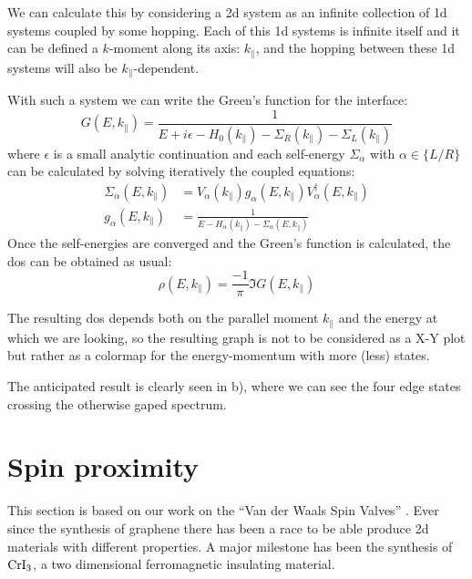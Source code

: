 We  can calculate this by considering a \ac{2d} system as an infinite collection of \ac{1d} systems coupled by some hopping. Each of this \ac{1d} systems is infinite itself and it can be defined a $k$-moment along its axis: $k_\parallel$, and the hopping between these \ac{1d} systems will also be $k_\parallel$-dependent.

With such a system we can write the Green's function for the interface:
\begin{equation}
  G(E,k_{\parallel}) = \frac{1}{E+i\epsilon-H_0(k_\parallel)-\Sigma_R(k_\parallel)-\Sigma_L(k_\parallel)}
\end{equation}
where $\epsilon$ is a small analytic continuation and each self-energy $\Sigma_\alpha$ with $\alpha\in\{L/R\}$ can be calculated by solving iteratively the coupled equations:
\begin{equation}
\begin{split}
  \Sigma_\alpha(E,k_\parallel) &= V_\alpha(k_\parallel)g_\alpha(E,k_\parallel)V^{\dagger}_\alpha(E,k_\parallel) \\
  g_\alpha(E,k_\parallel) &= \frac{1}{E-H_\alpha(k_\parallel)-\Sigma_\alpha(E,k_\parallel)}
\end{split}
\end{equation}
Once the self-energies are converged and the Green's function is calculated, the \ac{dos} can be obtained as usual:
\begin{equation}
   \rho(E,k_\parallel) = \frac{-1}{\pi}\Im{G(E,k_{\parallel})}
\end{equation}

The resulting \ac{dos} depends both on the parallel moment $k_\parallel$ and the energy at which we are looking, so the resulting graph is not to be considered as a X-Y plot but rather as a colormap for the energy-momentum with more (less) states.

The anticipated result is clearly seen in b), where we can see the four edge states crossing the otherwise gaped spectrum.





\section{Spin proximity}
This section is based on our work on the ``Van der Waals Spin Valves'' .
Ever since the synthesis of graphene there has been a race to be able produce \ac{2d} materials with different properties. A major milestone has been the synthesis of $\ce{CrI_3}$, a two dimensional ferromagnetic insulating material\cite{Klein2018,Song2018,Wang2018}. %

